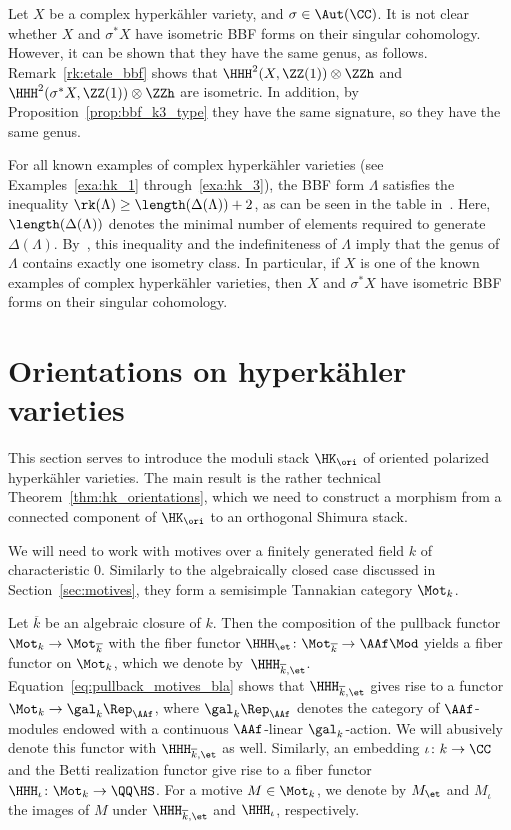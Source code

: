 \begin{remark}
Let $X$ be a complex hyperk\"ahler variety, and $\sigma \in \Aut(\CC)$. It is not clear whether $X$ and $\sigma^* X$ have isometric BBF forms on their singular cohomology. However, it can be shown that they have the same genus, as follows. Remark~\ref{rk:etale_bbf} shows that $\HHH^2(X,\ZZ(1)) \otimes \ZZh$ and $\HHH^2(\sigma^* X,\ZZ(1)) \otimes \ZZh$ are isometric. In addition, by Proposition~\ref{prop:bbf_k3_type} they have the same signature, so they have the same genus.

For all known examples of complex hyperk\"ahler varieties (see Examples~\ref{exa:hk_1} through~\ref{exa:hk_3}), the BBF form $\Lambda$ satisfies the inequality $\rk(\Lambda) \geq \length(\Delta(\Lambda)) + 2$, as can be seen in the table in~\cite{Rapagnetta}. Here, $\length(\Delta(\Lambda))$ denotes the minimal number of elements required to generate $\Delta(\Lambda)$. By~\cite[Theorem~1.14.2]{Nikulin}, this inequality and the indefiniteness of $\Lambda$ imply that the genus of $\Lambda$ contains exactly one isometry class. In particular, if $X$ is one of the known examples of complex hyperk\"ahler varieties, then $X$ and $\sigma^* X$ have isometric BBF forms on their singular cohomology. 
\end{remark}

\section{Orientations on hyperk\"ahler varieties}\label{sec:oriented_hks}
This section serves to introduce the moduli stack $\HK_{\ori}$ of oriented polarized hyperk\"ahler varieties. The main result is the rather technical Theorem~\ref{thm:hk_orientations}, which we need to construct a morphism from a connected component of $\HK_{\ori}$ to an orthogonal Shimura stack.

We will need to work with motives over a finitely generated field $k$ of characteristic $0$. Similarly to the algebraically closed case discussed in Section~\ref{sec:motives}, they form a semisimple Tannakian category $\Mot_k$. 

Let $\overline{k}$ be an algebraic closure of $k$. Then the composition of the pullback functor $\Mot_k \rightarrow \Mot_{\overline{k}}$ with the fiber functor $\HHH_{\et}\colon \Mot_{\overline{k}} \rightarrow \AAf\Mod$ yields a fiber functor on $\Mot_k$, which we denote by~$\HHH_{\overline{k},\et}$. Equation~\eqref{eq:pullback_motives_bla} shows that $\HHH_{\overline{k},\et}$ gives rise to a functor $\Mot_k \rightarrow \gal_k\Rep_{\AAf}$, where $\gal_k\Rep_{\AAf}$ denotes the category of $\AAf$-modules endowed with a continuous $\AAf$-linear $\gal_k$-action. We will abusively denote this functor with $\HHH_{\overline{k},\et}$ as well. Similarly, an embedding $\iota\colon k \rightarrow \CC$ and the Betti realization functor give rise to a fiber functor $\HHH_{\iota}\colon \Mot_k \rightarrow \QQ\HS$. For a motive $M \in \Mot_k$, we denote by $M_{\et}$ and $M_{\iota}$ the images of $M$ under $\HHH_{\overline{k},\et}$ and $\HHH_{\iota}$, respectively.


